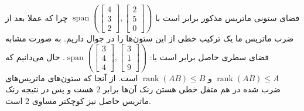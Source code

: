 \\
فضای ستونی ماتریس مذکور برابر است با
$\operatorname{span}(\begin{bmatrix}4 \\ 3 \\ 2\end{bmatrix}, \begin{bmatrix}2 \\ 5 \\ 0\end{bmatrix})$
چرا که عملا بعد از ضرب ماتریس ما یک ترکیب خطی از این ستون‌ها را در جوال داریم. به صورت مشابه
فضای سطری حاصل برابر است با:
$\operatorname{span}(\begin{bmatrix}3 \\ 4 \\ 4\end{bmatrix}, \begin{bmatrix}3 \\ 1 \\ 9\end{bmatrix})$.
حال می‌دانیم که
$\operatorname{rank}(AB) \leq A$
و
$\operatorname{rank}(AB) \leq B$
است. از آنجا که ستون‌های ماتریس‌های ضرب شده در هم متقل خطی هستن رنک آن‌ها برابر 2 هست و پس در نتیجه رنک ماتریس
حاصل نیز کوچکتر مساوی 2 است.



